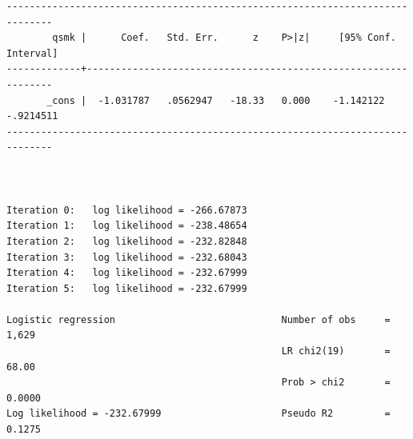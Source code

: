 \documentclass[
  10pt,
]{book}
\begin{document}
\begin{verbatim}
------------------------------------------------------------------------------
        qsmk |      Coef.   Std. Err.      z    P>|z|     [95% Conf. Interval]
-------------+----------------------------------------------------------------
       _cons |  -1.031787   .0562947   -18.33   0.000    -1.142122   -.9214511
------------------------------------------------------------------------------



Iteration 0:   log likelihood = -266.67873  
Iteration 1:   log likelihood = -238.48654  
Iteration 2:   log likelihood = -232.82848  
Iteration 3:   log likelihood = -232.68043  
Iteration 4:   log likelihood = -232.67999  
Iteration 5:   log likelihood = -232.67999  

Logistic regression                             Number of obs     =      1,629
                                                LR chi2(19)       =      68.00
                                                Prob > chi2       =     0.0000
Log likelihood = -232.67999                     Pseudo R2         =     0.1275


\end{verbatim}
\end{document}
